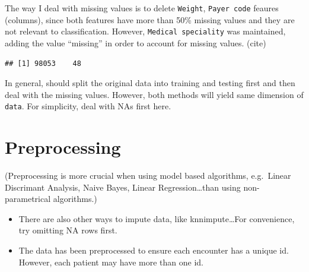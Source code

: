 \documentclass[]{article}
\newenvironment{Shaded}{\begin{snugshade}}{\end{snugshade}}
\newcommand{\KeywordTok}[1]{\textcolor[rgb]{0.13,0.29,0.53}{\textbf{{#1}}}}
\newcommand{\DataTypeTok}[1]{\textcolor[rgb]{0.13,0.29,0.53}{{#1}}}
\newcommand{\DecValTok}[1]{\textcolor[rgb]{0.00,0.00,0.81}{{#1}}}
\newcommand{\StringTok}[1]{\textcolor[rgb]{0.31,0.60,0.02}{{#1}}}
\newcommand{\NormalTok}[1]{{#1}}
\begin{document}
The way I deal with missing values is to delete \texttt{Weight},
\texttt{Payer code} feaures (columns), since both features have more
than 50\% missing values and they are not relevant to classification.
However, \texttt{Medical speciality} was maintained, adding the value
``missing'' in order to account for missing values. (cite)

\begin{Shaded}
\end{Shaded}

\begin{verbatim}
## [1] 98053    48
\end{verbatim}

In general, should split the original data into training and testing
first and then deal with the missing values. However, both methods will
yield same dimension of \texttt{data}. For simplicity, deal with NAs
first here.

\section{Preprocessing}\label{preprocessing}

(Preprocessing is more crucial when using model based algorithms,
e.g.~Linear Discrimant Analysis, Naive Bayes, Linear
Regression\ldots{}than using non-parametrical algorithms.)

\begin{itemize}
\item
  There are also other ways to impute data, like knnimpute\ldots{}For
  convenience, try omitting NA rows first.
\item
  The data has been preprocessed to ensure each encounter has a unique
  id. However, each patient may have more than one id.
\end{itemize}
\end{document}
